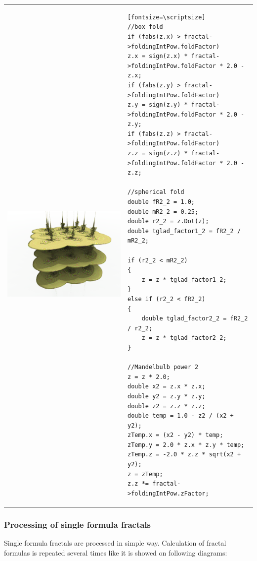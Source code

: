 \begin{tabular}{l l}
	\includegraphics[width=0.3\linewidth]{img/manual/media/formula_box_fold_pwr2.png}	
	& 
	\begin{minipage}[b]{0.5\linewidth}
		\begin{verbatim}[fontsize=\scriptsize]
//box fold
if (fabs(z.x) > fractal->foldingIntPow.foldFactor)
z.x = sign(z.x) * fractal->foldingIntPow.foldFactor * 2.0 - z.x;
if (fabs(z.y) > fractal->foldingIntPow.foldFactor)
z.y = sign(z.y) * fractal->foldingIntPow.foldFactor * 2.0 - z.y;
if (fabs(z.z) > fractal->foldingIntPow.foldFactor)
z.z = sign(z.z) * fractal->foldingIntPow.foldFactor * 2.0 - z.z;

//spherical fold
double fR2_2 = 1.0;
double mR2_2 = 0.25;
double r2_2 = z.Dot(z);
double tglad_factor1_2 = fR2_2 / mR2_2;

if (r2_2 < mR2_2)
{
	z = z * tglad_factor1_2;
}
else if (r2_2 < fR2_2)
{
	double tglad_factor2_2 = fR2_2 / r2_2;
	z = z * tglad_factor2_2;
}

//Mandelbulb power 2
z = z * 2.0;
double x2 = z.x * z.x;
double y2 = z.y * z.y;
double z2 = z.z * z.z;
double temp = 1.0 - z2 / (x2 + y2);
zTemp.x = (x2 - y2) * temp;
zTemp.y = 2.0 * z.x * z.y * temp;
zTemp.z = -2.0 * z.z * sqrt(x2 + y2);
z = zTemp;
z.z *= fractal->foldingIntPow.zFactor;
		\end{verbatim}
	\end{minipage}
\end{tabular} 

\subsubsection{Processing of single formula fractals}

Single formula fractals are processed in simple way. Calculation of fractal
formulas is repeated several times like it is showed on following
diagrams:\nolinebreak \nopagebreak

